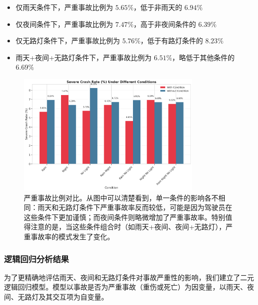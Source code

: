 \documentclass[12pt,a4paper]{article}
\begin{document}
\begin{itemize}
\item 仅雨天条件下，严重事故比例为 $5.65\%$，低于非雨天的 $6.94\%$
\item 仅夜间条件下，严重事故比例为 $7.47\%$，高于非夜间条件的 $6.39\%$
\item 仅无路灯条件下，严重事故比例为 $5.76\%$，低于有路灯条件的 $8.23\%$
\item 雨天+夜间+无路灯条件下，严重事故比例为 $6.51\%$，略低于其他条件的 $6.69\%$
\end{itemize}

\begin{figure}[H]
  \centering
  \includegraphics[width=0.8\textwidth]{severe_crash_rate_by_condition.png}
  \caption{严重事故比例对比。从图中可以清楚看到，单一条件的影响各不相同：雨天和无路灯条件下严重事故率反而较低，可能是因为驾驶员在这些条件下更加谨慎；而夜间条件则略微增加了严重事故率。特别值得注意的是，当这些条件组合时（如雨天+夜间、夜间+无路灯），严重事故率的模式发生了变化。}
  \label{fig:severe_rate_comparison}
\end{figure}

\subsubsection{逻辑回归分析结果}

为了更精确地评估雨天、夜间和无路灯条件对事故严重性的影响，我们建立了二元逻辑回归模型。模型以事故是否为严重事故（重伤或死亡）为因变量，以雨天、夜间、无路灯及其交互项为自变量。
\end{document}
